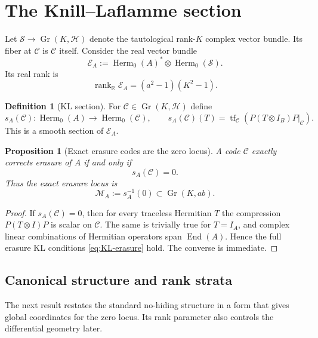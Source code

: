 \documentclass[11pt]{article}
\newtheorem{proposition}[theorem]{Proposition}
\theoremstyle{definition}
\newtheorem{definition}[theorem]{Definition}
\newcommand{\cH}{\mathcal H}
\newcommand{\cC}{\mathcal C}
\newcommand{\cM}{\mathcal M}
\newcommand{\cS}{\mathcal S}
\newcommand{\cE}{\mathcal E}
\newcommand{\Gr}{\operatorname{Gr}}
\newcommand{\Herm}{\operatorname{Herm}}
\newcommand{\rank}{\operatorname{rank}}
\newcommand{\tf}{\operatorname{tf}}
\newcommand{\R}{\mathbb R}
\newcommand{\1}{\mathbf 1}
\begin{document}
\section{The Knill--Laflamme section}

Let $\cS\to\Gr(K,\cH)$ denote the tautological rank-$K$ complex vector bundle.  Its fiber at $\cC$ is $\cC$ itself.  Consider the real vector bundle
\[
\cE_A
:=\Herm_0(A)^*\otimes \Herm_0(\cS).
\]
Its real rank is
\[
\rank_{\R}\cE_A=(a^2-1)(K^2-1).
\]

\begin{definition}[KL section]
For $\cC\in\Gr(K,\cH)$ define
\begin{equation}
s_A(\cC):\Herm_0(A)\to\Herm_0(\cC),
\qquad
s_A(\cC)(T)=\tf_{\cC}\!\left(P(T\otimes I_B)P\big|_{\cC}\right).
\label{eq:section-def}
\end{equation}
This is a smooth section of $\cE_A$.
\end{definition}

\begin{proposition}[Exact erasure codes are the zero locus]
A code $\cC$ exactly corrects erasure of $A$ if and only if
\[
s_A(\cC)=0.
\]
Thus the exact erasure locus is
\[
\cM_A:=s_A^{-1}(0)\subset\Gr(K,ab).
\]
\end{proposition}

\begin{proof}
If $s_A(\cC)=0$, then for every traceless Hermitian $T$ the compression $P(T\otimes I)P$ is scalar on $\cC$.  The same is trivially true for $T=I_A$, and complex linear combinations of Hermitian operators span $\operatorname{End}(A)$.  Hence the full erasure KL conditions \eqref{eq:KL-erasure} hold.  The converse is immediate.
\end{proof}

\subsection{Canonical structure and rank strata}

The next result restates the standard no-hiding structure in a form that gives global coordinates for the zero locus.  Its rank parameter also controls the differential geometry later.
\end{document}
